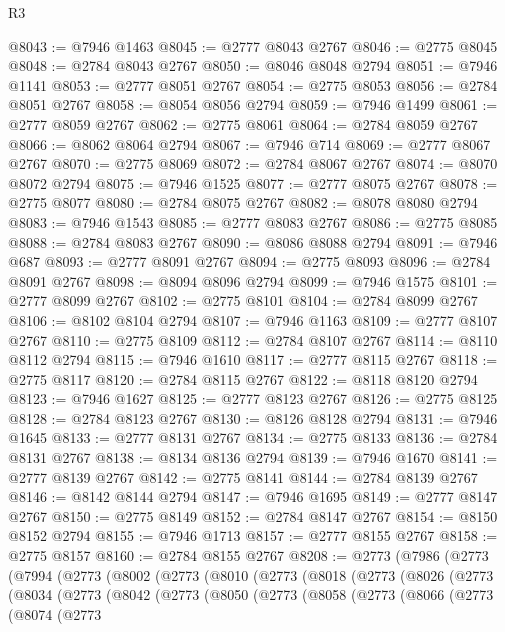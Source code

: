 \begin{lexlean}{R3}
\begin{coremodule}
@8043 := @7946 @1463
@8045 := @2777 @8043 @2767
@8046 := @2775 @8045
@8048 := @2784 @8043 @2767
@8050 := @8046 @8048 @2794
@8051 := @7946 @1141
@8053 := @2777 @8051 @2767
@8054 := @2775 @8053
@8056 := @2784 @8051 @2767
@8058 := @8054 @8056 @2794
@8059 := @7946 @1499
@8061 := @2777 @8059 @2767
@8062 := @2775 @8061
@8064 := @2784 @8059 @2767
@8066 := @8062 @8064 @2794
@8067 := @7946 @714
@8069 := @2777 @8067 @2767
@8070 := @2775 @8069
@8072 := @2784 @8067 @2767
@8074 := @8070 @8072 @2794
@8075 := @7946 @1525
@8077 := @2777 @8075 @2767
@8078 := @2775 @8077
@8080 := @2784 @8075 @2767
@8082 := @8078 @8080 @2794
@8083 := @7946 @1543
@8085 := @2777 @8083 @2767
@8086 := @2775 @8085
@8088 := @2784 @8083 @2767
@8090 := @8086 @8088 @2794
@8091 := @7946 @687
@8093 := @2777 @8091 @2767
@8094 := @2775 @8093
@8096 := @2784 @8091 @2767
@8098 := @8094 @8096 @2794
@8099 := @7946 @1575
@8101 := @2777 @8099 @2767
@8102 := @2775 @8101
@8104 := @2784 @8099 @2767
@8106 := @8102 @8104 @2794
@8107 := @7946 @1163
@8109 := @2777 @8107 @2767
@8110 := @2775 @8109
@8112 := @2784 @8107 @2767
@8114 := @8110 @8112 @2794
@8115 := @7946 @1610
@8117 := @2777 @8115 @2767
@8118 := @2775 @8117
@8120 := @2784 @8115 @2767
@8122 := @8118 @8120 @2794
@8123 := @7946 @1627
@8125 := @2777 @8123 @2767
@8126 := @2775 @8125
@8128 := @2784 @8123 @2767
@8130 := @8126 @8128 @2794
@8131 := @7946 @1645
@8133 := @2777 @8131 @2767
@8134 := @2775 @8133
@8136 := @2784 @8131 @2767
@8138 := @8134 @8136 @2794
@8139 := @7946 @1670
@8141 := @2777 @8139 @2767
@8142 := @2775 @8141
@8144 := @2784 @8139 @2767
@8146 := @8142 @8144 @2794
@8147 := @7946 @1695
@8149 := @2777 @8147 @2767
@8150 := @2775 @8149
@8152 := @2784 @8147 @2767
@8154 := @8150 @8152 @2794
@8155 := @7946 @1713
@8157 := @2777 @8155 @2767
@8158 := @2775 @8157
@8160 := @2784 @8155 @2767
@8208 := @2773
    (@7986
      (@2773
        (@7994
          (@2773
            (@8002
              (@2773
                (@8010
                  (@2773
                    (@8018
                      (@2773
                        (@8026
                          (@2773
                            (@8034
                              (@2773
                                (@8042
                                  (@2773
                                    (@8050
                                      (@2773
                                        (@8058
                                          (@2773
                                            (@8066
                                              (@2773
                                                (@8074
                                                  (@2773

\end{coremodule}
\end{lexlean}
